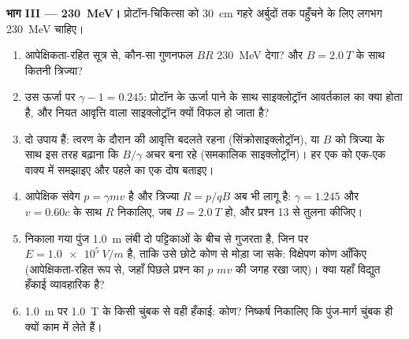\begin{problem}
\medskip
\noindent\textbf{भाग III --- \qty{230}{MeV}।}
प्रोटॉन-चिकित्सा को \qty{30}{cm} गहरे अर्बुदों तक पहुँचने के लिए लगभग
\qty{230}{MeV} चाहिए।
\begin{enumerate}[resume]
  \item आपेक्षिकता-रहित सूत्र से, कौन-सा गुणनफल $BR$ \qty{230}{MeV} देगा?
        और $B = \qty{2.0}{T}$ के साथ कितनी त्रिज्या?
  \item उस ऊर्जा पर $\gamma - 1 = 0.245$: प्रोटॉन के ऊर्जा पाने के साथ
        साइक्लोट्रॉन आवर्तकाल का क्या होता है, और नियत आवृत्ति वाला
        साइक्लोट्रॉन क्यों विफल हो जाता है?
  \item दो उपाय हैं: त्वरण के दौरान  की आवृत्ति बदलते रहना
        (सिंक्रोसाइक्लोट्रॉन), या $B$ को त्रिज्या के साथ इस तरह बढ़ाना कि
        $B/\gamma$ अचर बना रहे (समकालिक साइक्लोट्रॉन)। हर एक को एक-एक
        वाक्य में समझाइए और पहले का एक दोष बताइए।
  \item आपेक्षिक संवेग $p = \gamma mv$ है और त्रिज्या $R =
        p/qB$ अब भी लागू है: $\gamma = 1.245$ और $v = 0.60c$ के साथ
        $R$ निकालिए, जब $B = \qty{2.0}{T}$ हो, और प्रश्न 13 से तुलना कीजिए।
  \item निकाला गया पुंज \qty{1.0}{m} लंबी दो पट्टिकाओं के बीच से गुजरता
        है, जिन पर $E = \qty{1.0e5}{V/m}$ है, ताकि उसे छोटे कोण से मोड़ा
        जा सके: विक्षेपण कोण आँकिए (आपेक्षिकता-रहित रूप से, जहाँ पिछले
        प्रश्न का $p$ $mv$ की जगह रखा जाए)। क्या यहाँ विद्युत हँकाई व्यावहारिक
        है?
  \item \qty{1.0}{m} पर \qty{1.0}{T} के किसी चुंबक से वही हँकाई: कोण?
        निष्कर्ष निकालिए कि पुंज-मार्ग चुंबक ही क्यों काम में लेते हैं।
\end{enumerate}


\end{problem}
